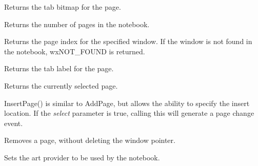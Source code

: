 
Returns the tab bitmap for the page.

\label{wxauinotebookgetpagecount}


Returns the number of pages in the notebook.

\label{wxauinotebookgetpageindex}


Returns the page index for the specified window.  If the window is not found in
the notebook, wxNOT\_FOUND is returned.

\label{wxauinotebookgetpagetext}


Returns the tab label for the page.

\label{wxauinotebookgetselection}


Returns the currently selected page.

\label{wxauinotebookinsertpage}


InsertPage() is similar to AddPage, but allows the ability to specify the insert location.
If the {\it select} parameter is true, calling this will generate a page change event.

\label{wxauinotebookremovepage}


Removes a page, without deleting the window pointer.

\label{wxauinotebooksetartprovider}


Sets the art provider to be used by the notebook.

\label{wxauinotebooksetpagebitmap}

